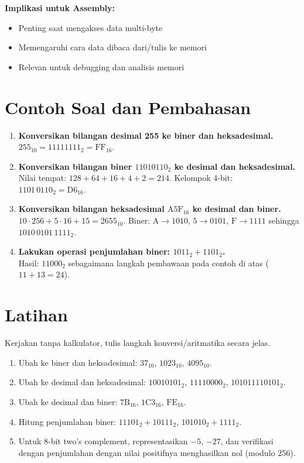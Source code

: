 \textbf{Implikasi untuk Assembly:}
\begin{itemize}
    \item Penting saat mengakses data multi-byte
    \item Memengaruhi cara data dibaca dari/tulis ke memori
    \item Relevan untuk debugging dan analisis memori
\end{itemize}

\section{Contoh Soal dan Pembahasan}\label{sec:pengenalan-contoh}
\begin{enumerate}
    \item \textbf{Konversikan bilangan desimal 255 ke biner dan heksadesimal.}\\
    \(255_{10} = 11111111_2 = \mathrm{FF}_{16}\).

    \item \textbf{Konversikan bilangan biner \(11010110_2\) ke desimal dan heksadesimal.}\\
    Nilai tempat: \(128+64+16+4+2 = 214\). Kelompok 4-bit: \(1101\,0110_2 = \mathrm{D6}_{16}\).

    \item \textbf{Konversikan bilangan heksadesimal \(\mathrm{A5F}_{16}\) ke desimal dan biner.}\\
    \(10\cdot 256 + 5\cdot 16 + 15 = 2655_{10}\). Biner: \(\mathrm{A}\to 1010\), \(\mathrm{5}\to 0101\), \(\mathrm{F}\to 1111\) sehingga \(1010\,0101\,1111_2\).

    \item \textbf{Lakukan operasi penjumlahan biner: \(1011_2 + 1101_2\).}\\
    Hasil: \(11000_2\) sebagaimana langkah pembawaan pada contoh di atas (\(11+13=24\)).
\end{enumerate}

\section{Latihan}
Kerjakan tanpa kalkulator, tulis langkah konversi/aritmatika secara jelas.
\begin{enumerate}
    \item Ubah ke biner dan heksadesimal: \(37_{10}\), \(1023_{10}\), \(4095_{10}\).
    \item Ubah ke desimal dan heksadesimal: \(10010101_2\), \(11110000_2\), \(101011110101_2\).
    \item Ubah ke desimal dan biner: \(\mathrm{7B}_{16}\), \(\mathrm{1C3}_{16}\), \(\mathrm{FE}_{16}\).
    \item Hitung penjumlahan biner: \(11101_2 + 10111_2\), \(101010_2 + 1111_2\).
    \item Untuk 8-bit two's complement, representasikan \(-5\), \(-27\), dan verifikasi dengan penjumlahan dengan nilai positifnya menghasilkan nol (modulo 256).
\end{enumerate}

